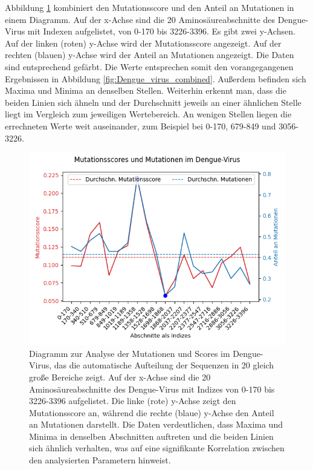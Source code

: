 \documentclass[german,version-2022-01]{uzl-thesis}
\begin{document}
Abbildung \ref{fig:Dengue_virus_scores_and_mutations_bereiche} kombiniert den Mutationsscore und den Anteil an Mutationen in einem Diagramm. Auf der x-Achse sind die 20 Aminos\"aureabschnitte des Dengue-Virus mit Indexen aufgelistet, von 0-170 bis 3226-3396. Es gibt zwei y-Achsen. Auf der linken (roten) y-Achse wird der Mutationsscore angezeigt. Auf der rechten (blauen) y-Achse wird der Anteil an Mutationen angezeigt. Die Daten sind entsprechend gef\"arbt. Die Werte entsprechen somit den vorangegangenen Ergebnissen in Abbildung \ref{fig:Dengue_virus_combined}. Au\ss{}erdem befinden sich Maxima und Minima an denselben Stellen. Weiterhin erkennt man, dass die beiden Linien sich \"ahneln und der Durchschnitt jeweils an einer \"ahnlichen Stelle liegt im Vergleich zum jeweiligen Wertebereich. An wenigen Stellen liegen die errechneten Werte weit auseinander, zum Beispiel bei 0-170, 679-849 und 3056-3226.
\begin{figure}[tbp]
  \centering
  \includegraphics[scale=0.65]{Images/Diagramm_Scores_und_Mutationen_Dengue_viren_Bereiche.png}
  \caption{Diagramm zur Analyse der Mutationen und Scores im Dengue-Virus, das die automatische Aufteilung der Sequenzen in 20 gleich gro\ss{}e Bereiche zeigt. Auf der x-Achse sind die 20 Aminos\"aureabschnitte des Dengue-Virus mit Indizes von 0-170 bis 3226-3396 aufgelistet. Die linke (rote) y-Achse zeigt den Mutationsscore an, w\"ahrend die rechte (blaue) y-Achse den Anteil an Mutationen darstellt. Die Daten verdeutlichen, dass Maxima und Minima in denselben Abschnitten auftreten und die beiden Linien sich \"ahnlich verhalten, was auf eine signifikante Korrelation zwischen den analysierten Parametern hinweist.}
  \label{fig:Dengue_virus_scores_and_mutations_bereiche} 
\end{figure}
\end{document}
